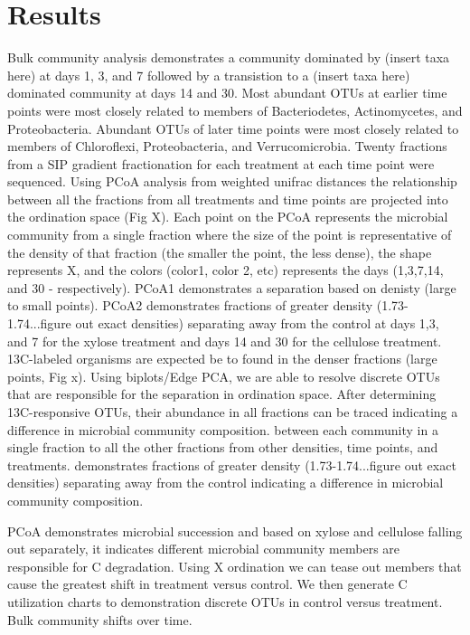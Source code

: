 \section{Results}

Bulk community analysis demonstrates a community dominated by (insert taxa here) at days 1, 3, and 7 followed by a transistion to a (insert taxa here) dominated community at days 14 and 30. Most abundant OTUs at earlier time points were most closely related to members of Bacteriodetes, Actinomycetes, and Proteobacteria. Abundant OTUs of later time points were most closely related to members of Chloroflexi, Proteobacteria, and Verrucomicrobia. Twenty fractions from a SIP gradient fractionation for each treatment at each time point were sequenced. Using PCoA analysis from weighted unifrac distances the relationship between all the fractions from all treatments and time points are projected into the ordination space (Fig X). Each point on the PCoA represents the microbial community from a single fraction where the size of the point is representative of the density of that fraction (the smaller the point, the less dense), the shape represents X, and the colors (color1, color 2, etc) represents the days (1,3,7,14, and 30 - respectively). PCoA1 demonstrates a separation based on denisty (large to small points). PCoA2 demonstrates fractions of greater density (1.73-1.74...figure out exact densities) separating away from the control at days 1,3, and 7 for the xylose treatment and days 14 and 30 for the cellulose treatment. 13C-labeled organisms are expected be to found in the denser fractions (large points, Fig x). Using biplots/Edge PCA, we are able to resolve discrete OTUs that are responsible for the separation in ordination space. After determining 13C-responsive OTUs, their abundance in all fractions can be traced    indicating a difference in microbial community composition. 
between each community in a single fraction to all the other fractions from other densities, time points, and treatments.  
demonstrates fractions of greater density (1.73-1.74...figure out exact densities) separating away from the control indicating a difference in microbial community composition.          

PCoA demonstrates microbial succession and based on xylose and cellulose falling out separately, it indicates different microbial community members are responsible for C degradation.  Using X ordination we can tease out members that cause the greatest shift in treatment versus control.  We then generate C utilization charts to demonstration discrete OTUs in control versus treatment.  Bulk community shifts over time.  